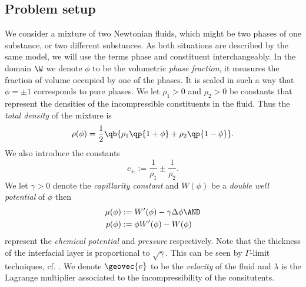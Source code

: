 \documentclass[final]{amsart}
\numberwithin{equation}{section}
\begin{document}
\subsection{Problem setup}

We consider a mixture of two Newtonian fluids, which might be two
phases of one substance, or two different substances. As both
situations are described by the same model, we will use the terms
phase and constituent interchangeably. In the domain $\W$ we denote
$\phi$ to be the volumetric \emph{phase fraction}, \ie it measures the
fraction of volume occupied by one of the phases. It is scaled in such
a way that $\phi=\pm 1$ corresponds to pure phases. We let $\rho_1 >
0$ and $\rho_2 >0$ be constants that represent the densities of the
incompressible constituents in the fluid. Thus the \emph{total
  density} of the mixture is
\begin{equation}\label{eq:dens}
  \rho(\phi)
  =
  \frac{1}{2} 
  \qb{
    \rho_1
    \qp{
      1+\phi
      }
    +
    \rho_2
    \qp{
      1-\phi
    }
  }.
\end{equation}
We also introduce the constants
\begin{equation}
  \label{eq:cpm}
  c_\pm := \frac {1}{\rho_1} \pm \frac{1}{\rho_2}.
\end{equation}
We let $\gamma > 0$ denote the \emph{capillarity constant} and
$W(\phi)$ be a \emph{double well potential} of $\phi$ then
\begin{equation}
  \begin{split}
    \mu(\phi) &:= W'(\phi) - \gamma \Delta \phi \AND
    \\
    p(\phi) &:= \phi W'(\phi) - W(\phi)
  \end{split}
\end{equation}
represent the \emph{chemical potential} and \emph{pressure}
respectively.  {Note that the thickness of the
  interfacial layer is proportional to $\sqrt{\gamma}$. This can be
  seen by $\Gamma$-limit techniques, cf. \cite{Ste88,ORS90}.} We
denote ${\geovec{v}}$ to be the \emph{velocity} of the fluid and $\lambda$
is the Lagrange multiplier associated to the incompressibility of the
consitutent{s}.
\end{document}

